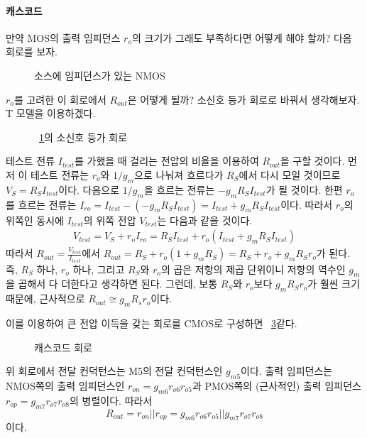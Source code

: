 \paragraph{캐스코드}
만약 MOS의 출력 임피던스 $r_o$의 크기가 그래도 부족하다면 어떻게 해야 할까? 다음 회로를 보자.
\begin{figure}[!hpb]
    \centering
    \caption{소스에 임피던스가 있는 NMOS}\label{fig:src degeneration output impedance}
\end{figure}
$r_o$를 고려한 이 회로에서 $R_{out}$은 어떻게 될까? 소신호 등가 회로로 바꿔서 생각해보자. T 모델을 이용하겠다.
\begin{figure}[!hpb]
    \centering
    \caption{\figurename~\ref{fig:src degeneration output impedance}의 소신호 등가 회로}\label{fig:src degeneration output impedance eq circuit}
\end{figure}
테스트 전류 $I_{test}$를 가했을 때 걸리는 전압의 비율을 이용하여 $R_{out}$을 구할 것이다.
먼저 이 테스트 전류는 $r_o$와 $1/g_m$으로 나눠져 흐르다가 $R_S$에서 다시 모일 것이므로 $V_S=R_SI_{test}$이다.
다음으로 $1/g_m$을 흐르는 전류는 $-g_mR_SI_{test}$가 될 것이다.
한편 $r_o$를 흐르는 전류는 $I_{ro}=I_{test}-(-g_mR_SI_{test})=I_{test}+g_mR_SI_{test}$이다.
따라서 $r_o$의 위쪽인 동시에 $I_{test}$의 위쪽 전압 $V_{test}$는 다음과 같을 것이다.
\begin{eqnarray*}
    V_{test}=V_S+r_oI_{ro}
    =R_SI_{test}+r_o\left(I_{test}+g_mR_SI_{test}\right)
\end{eqnarray*}
따라서 $R_{out}=\frac{V_{test}}{I_{test}}$에서 $R_{out}=R_S+r_o\left(1+g_mR_S\right)=R_S+r_o+g_mR_Sr_o$가 된다.
즉, $R_S$ 하나, $r_o$ 하나, 그리고 $R_S$와 $r_o$의 곱은 저항의 제곱 단위이니 저항의 역수인 $g_m$을 곱해서 다 더한다고 생각하면 된다.
그런데, 보통 $R_S$와 $r_o$보다 $g_mR_Sr_o$가 훨씬 크기 때문에, 근사적으로 $R_{out}\cong g_mR_sr_o$이다.

이를 이용하여 큰 전압 이득을 갖는 회로를 CMOS로 구성하면 \figurename~\ref{fig:cascode}\와 같다.
\begin{figure}[!tpb]
    \centering
    \caption{캐스코드 회로}\label{fig:cascode}
\end{figure}
위 회로에서 전달 컨덕턴스는 M5의 전달 컨덕턴스인 $g_{m5}$이다. 출력 임피던스는 NMOS쪽의 출력 임피던스인 $r_{on}=g_{m6}r_{o6}r_{o5}$과 PMOS쪽의 (근사적인) 출력 임피던스 $r_{op}=g_{m7}r_{o7}r_{o8}$의 병렬이다.
따라서 
\begin{equation*}
    R_{out}=r_{on}\left \vert \right \vert r_{op}=g_{m6}r_{o6}r_{o5}\left \vert \right \vert g_{m7}r_{o7}r_{o8}
\end{equation*}
이다.

